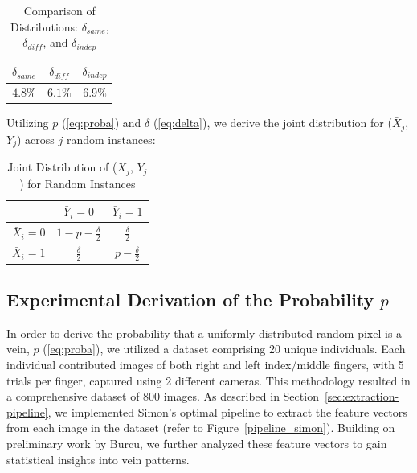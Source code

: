 \begin{table}[H]
    \centering
    \renewcommand{\arraystretch}{1.25}\begin{tabular}{|c|c|c|}
        \hline
        $\delta_{same}$ & $\delta_{diff}$ & $\delta_{indep}$\\
        \hline
        $4.8\%$ & $6.1\%$ & $6.9\%$\\
        \hline
    \end{tabular}
\caption{Comparison of Distributions: $\delta_{same}$, $\delta_{diff}$, and $\delta_{indep}$}
\end{table}

Utilizing $p$ (\ref{eq:proba}) and $\delta$ (\ref{eq:delta}), we derive the joint distribution for (\(\bar{X}_j\), \(\bar{Y}_j\)) across \(j\) random instances:

\begin{table}[H]
    \centering
    \renewcommand{\arraystretch}{1.5}
    \begin{tabular}{|c|c|c|}
        \hline
        & $\bar{Y}_i = 0$ & $\bar{Y}_i = 1$\\
        \hline
        $\bar{X}_i = 0$ & $1 - p - \frac{\delta}{2}$ & $\frac{\delta}{2}$\\
        \hline
        $\bar{X}_i = 1$ & $\frac{\delta}{2}$ & $p - \frac{\delta}{2}$\\
        \hline
    \end{tabular}
    \caption{Joint Distribution of ($\bar{X}_j$, $\bar{Y}_j$) for Random Instances}
\end{table}

\subsection{Experimental Derivation of the Probability \(p\)}

In order to derive the probability that a uniformly distributed random pixel is a vein, $p$ (\ref{eq:proba}), we utilized a dataset comprising 20 unique individuals. Each individual contributed images of both right and left index/middle fingers, with 5 trials per finger, captured using 2 different cameras. This methodology resulted in a comprehensive dataset of 800 images. As described in Section~\ref{sec:extraction-pipeline}, we implemented Simon's optimal pipeline to extract the feature vectors from each image in the dataset (refer to Figure~\ref{pipeline_simon}). Building on preliminary work by Burcu, we further analyzed these feature vectors to gain statistical insights into vein patterns.

